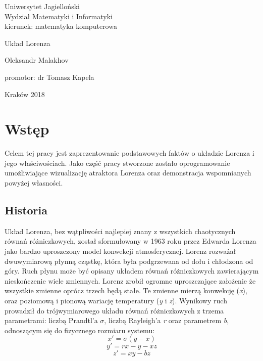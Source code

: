 \documentclass[12pt]{report}
\begin{document}
\begin{titlepage}
	\begin{center}
	\large 
	Uniwersytet Jagielloński\\
	Wydział Matematyki i Informatyki\\
	kierunek: matematyka komputerowa
	
	\vspace{5.0cm}
	\huge
	Układ Lorenza
	
	\vspace{1.0cm}
	\large
	Oleksandr Malakhov
	\end{center}
	
	\vspace{3.0cm}
	\begin{flushright}
	promotor: dr Tomasz Kapela
	\end{flushright}
	
	\vspace{4.0cm}
	\begin{center}
		\footnotesize
		Kraków 2018
	\end{center}
\end{titlepage}

\tableofcontents

\chapter{Wstęp}
	\par Celem tej pracy jest zaprezentowanie podstawowych faktów o układzie Lorenza i jego właściwościach. Jako część pracy stworzone zostało oprogramowanie umożliwiające wizualizację atraktora Lorenza oraz demonstracja wspomnianych powyżej własności.

	\section{Historia}
	\par Układ Lorenza, bez wątpliwości najlepiej znany z wszystkich chaotycznych równań różniczkowych, został sformułowany w 1963 roku przez Edwarda Lorenza jako bardzo uproszczony model konwekcji atmosferycznej. Lorenz rozważał dwuwymiarową płynną cząstkę, która była podgrzewana od dołu i chłodzona od góry. Ruch płynu może być opisany układem równań różniczkowych zawierającym nieskończenie wiele zmiennych. Lorenz zrobił ogromne uproszczające założenie że wszystkie zmienne oprócz trzech będą stałe. Te zmienne mierzą konwekcję (\textit{x}), oraz poziomową i pionową wariację temperatury (\textit{y} i \textit{z}). Wynikowy ruch prowadził do trójwymiarowego układu równań różniczkowych z trzema parametrami: liczbą Prandtl'a $\sigma$, liczbą Rayleigh'a \textit{r} oraz parametrem \textit{b}, odnoszącym się do fizycznego rozmiaru systemu:
		\[ x' = \sigma (y - x) \]
		\[ y' = rx - y - xz \]
		\[ z' = xy - bz \]
\end{document}
